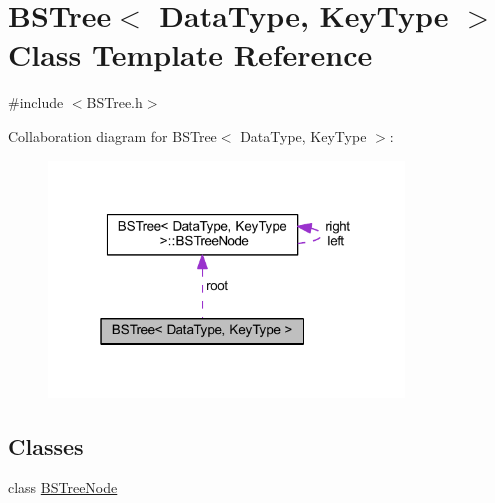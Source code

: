 \hypertarget{class_b_s_tree}{}\section{B\+S\+Tree$<$ Data\+Type, Key\+Type $>$ Class Template Reference}
\label{class_b_s_tree}


{\ttfamily \#include $<$B\+S\+Tree.\+h$>$}



Collaboration diagram for B\+S\+Tree$<$ Data\+Type, Key\+Type $>$\+:
\nopagebreak
\begin{figure}[H]
\begin{center}
\leavevmode
\includegraphics[width=268pt]{class_b_s_tree__coll__graph}
\end{center}
\end{figure}
\subsection*{Classes}
\begin{DoxyCompactItemize}
\item 
class \hyperlink{class_b_s_tree_1_1_b_s_tree_node}{B\+S\+Tree\+Node}
\end{DoxyCompactItemize}
